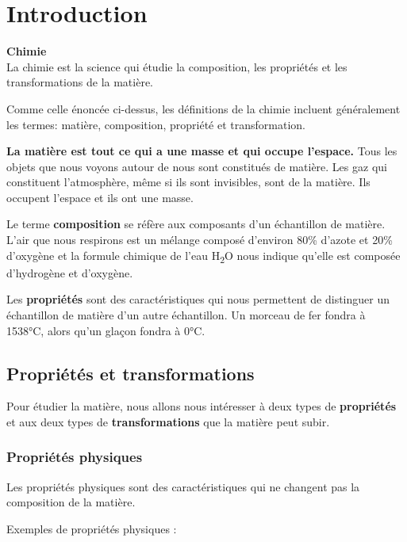 \documentclass[
  11pt,
  a4paper,
  openany]{book}
\begin{document}
\chapter{Introduction}\label{introduction}

\begin{tcolorbox}
\textbf{Chimie}\\
La chimie est la science qui étudie la composition, les propriétés et les transformations de la matière.

\end{tcolorbox}

Comme celle énoncée ci-dessus, les définitions de la chimie incluent généralement les termes: matière, composition, propriété et transformation.

\textbf{La matière est tout ce qui a une masse et qui occupe l'espace.} Tous les objets que nous voyons autour de nous sont constitués de matière. Les gaz qui constituent l'atmosphère, même si ils sont invisibles, sont de la matière. Ils occupent l'espace et ils ont une masse.

Le terme \textbf{composition} se réfère aux composants d'un échantillon de matière. L'air que nous respirons est un mélange composé d'environ 80\% d'azote et 20\% d'oxygène et la formule chimique de l'eau H\textsubscript{2}O nous indique qu'elle est composée d'hydrogène et d'oxygène.

Les \textbf{propriétés} sont des caractéristiques qui nous permettent de distinguer un échantillon de matière d'un autre échantillon. Un morceau de fer fondra à 1538°C, alors qu'un glaçon fondra à 0°C.

\section{Propriétés et transformations}\label{propriuxe9tuxe9s-et-transformations}

Pour étudier la matière, nous allons nous intéresser à deux types de \textbf{propriétés} et aux deux types de \textbf{transformations} que la matière peut subir.

\subsection{Propriétés physiques}\label{propriuxe9tuxe9s-physiques}

Les propriétés physiques sont des caractéristiques qui ne changent pas la composition de la matière.

Exemples de propriétés physiques :
\end{document}
